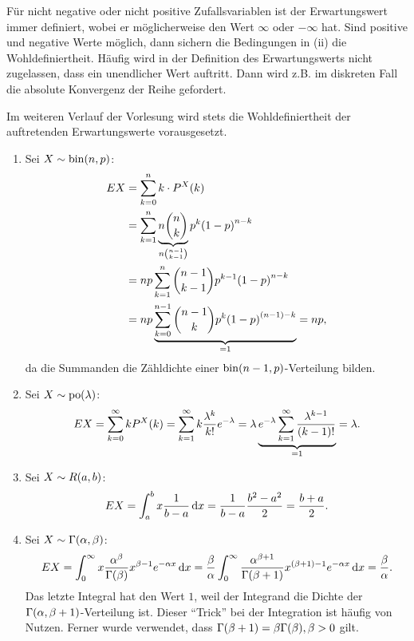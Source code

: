 \documentclass{lecture}
\begin{document}
    Für nicht negative oder nicht positive Zufallsvariablen ist der Erwartungswert immer definiert, wobei er möglicherweise den Wert \(\infty\) oder \(-\infty\) hat.
    Sind positive und negative Werte möglich, dann sichern die Bedingungen in (ii) die Wohldefiniertheit.
    Häufig wird in der Definition des Erwartungswerts nicht zugelassen, dass ein unendlicher Wert auftritt.
    Dann wird z.B. im diskreten Fall die absolute Konvergenz der Reihe gefordert.
    
    Im weiteren Verlauf der Vorlesung wird stets die Wohldefiniertheit der auftretenden Erwartungswerte vorausgesetzt.
    
    \begin{example}
        \begin{enumerate}
            \item Sei \(X \sim \bin\parentheses*{n, p}\):
            \begin{align*}
                EX &= \sum_{k = 0}^n k \cdot P^X\parentheses*{k}\\
                &= \sum_{k = 1}^n \underbrace{n\binom{n}{k}}_{n\binom{n - 1}{k - 1}}p^k \parentheses*{1 - p}^{n - k}\\
                &= np\sum_{k = 1}^n \binom{n - 1}{k - 1}p^{k - 1}\parentheses*{1 - p}^{n - k}\\
                &= np\underbrace{\sum_{k = 0}^{n - 1}\binom{n - 1}{k}p^k \parentheses*{1 - p}^{\parentheses*{n - 1} - k}}_{= 1} = np,
            \end{align*}
            da die Summanden die Zähldichte einer \(\bin\parentheses*{n - 1, p}\)-Verteilung bilden.
            \item Sei \(X \sim \po\parentheses*{\lambda}\):
            \[
                EX = \sum_{k = 0}^\infty kP^X\parentheses*{k} = \sum_{k = 1}^\infty k\frac{\lambda^k}{k!}e^{-\lambda} = \lambda \underbrace{e^{-\lambda}\sum_{k = 1}^\infty \frac{\lambda^{k - 1}}{\parentheses*{k - 1}!}}_{= 1} = \lambda.
            \]
            \item Sei \(X \sim R\parentheses*{a, b}\):
            \[
                EX = \int_a^b x\frac{1}{b - a}\mathop{\mathrm{d}\!} x = \frac{1}{b - a}\frac{b^2 - a^2}{2} = \frac{b + a}{2}.
            \]
            \item Sei \(X \sim \Gamma\parentheses*{\alpha, \beta}\):
            \[
                EX = \int_0^\infty x\frac{\alpha^\beta}{\Gamma\parentheses*{\beta}}x^{\beta - 1}e^{-\alpha x}\d x = \frac{\beta}{\alpha}\int_0^\infty \frac{\alpha^{\beta + 1}}{\Gamma\parentheses*{\beta + 1}}x^{\parentheses*{\beta + 1} - 1}e^{-\alpha x}\d x = \frac{\beta}{\alpha}.
            \]
            Das letzte Integral hat den Wert \(1\), weil der Integrand die Dichte der \(\Gamma\parentheses*{\alpha, \beta + 1}\)-Verteilung ist.
            Dieser ``Trick'' bei der Integration ist häufig von Nutzen.
            Ferner wurde verwendet, dass \(\Gamma\parentheses*{\beta + 1} = \beta\Gamma\parentheses*{\beta}, \beta > 0\) gilt.
            

\end{enumerate}
\end{example}
\end{document}

